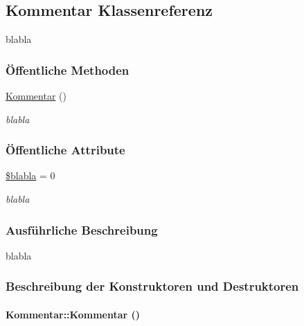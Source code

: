 \hypertarget{classKommentar}{
\subsection{Kommentar Klassenreferenz}
\label{classKommentar}
}
blabla  


\subsubsection*{\"{O}ffentliche Methoden}
\begin{CompactItemize}
\item 
\hyperlink{classKommentar_850b68328808c92ed5b2b30bfa12f311}{Kommentar} ()
\begin{CompactList}\small\item\em blabla \item\end{CompactList}\end{CompactItemize}
\subsubsection*{\"{O}ffentliche Attribute}
\begin{CompactItemize}
\item 
\hyperlink{classKommentar_fdf104e05a476d5c31598067b7f8f17d}{\$blabla} = 0
\begin{CompactList}\small\item\em blabla \item\end{CompactList}\end{CompactItemize}


\subsubsection{Ausf\"{u}hrliche Beschreibung}
blabla 



\subsubsection{Beschreibung der Konstruktoren und Destruktoren}
\hypertarget{classKommentar_850b68328808c92ed5b2b30bfa12f311}{
\paragraph[Kommentar]{\setlength{\rightskip}{0pt plus 5cm}Kommentar::Kommentar ()}\hfill}
\label{classKommentar_850b68328808c92ed5b2b30bfa12f311}


